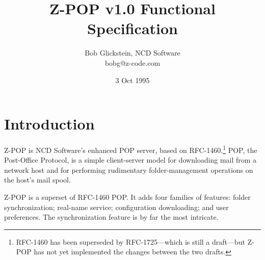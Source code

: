 

\newcommand{\naive}{na\"{\i}ve}
\newcommand{\dfn}[1]{{\it #1}}
\newcommand{\var}[1]{{\it #1}}
\newcommand{\PMD}[2]{PMD$_{#1,#2}$}
\newcommand{\HPMD}[3]{HPMD$^{#1}_{#2,#3}$}
\newcommand{\bmax}{{b_{\rm max}}}
\newcommand{\samp}[1]{`{\tt #1}'}
\newcommand{\setname}[1]{{\cal #1}}
\newcommand{\strong}[1]{{\bf #1}}
\newcommand{\code}[1]{{\tt #1}}
\newcommand{\ceil}[1]{\lceil #1 \rceil}

\newenvironment{codelist}{ %
  \begin{list}{}{\renewcommand{\makelabel}[1]{{\rm {\tt ##1}.}\hfill}}}{ %
  \end{list}}

\newenvironment{example}{ %
  \begin{quotation}\begin{tt}}{\end{tt}\end{quotation}}

\newenvironment{conversation}{\begin{footnotesize}}{\end{footnotesize}}



\title{Z-POP v1.0 Functional Specification}
\author{Bob Glickstein, NCD Software \\
bobg@z-code.com}
\date{3 Oct 1995}
\maketitle

\section{Introduction}

Z-POP is NCD Software's enhanced POP server, based on
RFC-1460.\footnote{RFC-1460 has been superseded by RFC-1725---which is
still a draft---but Z-POP has not yet implemented the changes between
the two drafts.}  POP, the Post-Office Protocol, is a simple
client-server model for downloading mail from a network host and for
performing rudimentary folder-management operations on the host's mail
spool.

Z-POP is a superset of RFC-1460 POP.  It adds four families of
features: folder synchronization; real-name service; configuration
downloading; and user preferences.  The synchronization feature is by
far the most intricate.


